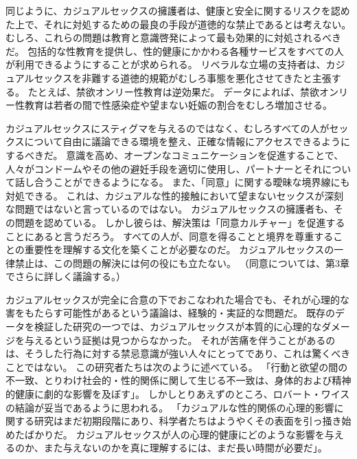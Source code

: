 \documentclass[paper=a4,book,openany]{jlreq}
\newcommand{\ig}[1]{}           %
\begin{document}
同じように、カジュアルセックスの擁護者は、健康と安全に関するリスクを認めた上で、それに対処するための最良の手段が道徳的な禁止であるとは考えない。
むしろ、これらの問題は教育と意識啓発によって最も効果的に対処されるべきだ。
包括的な性教育を提供し、性的健康にかかわる各種サービスをすべての人が利用できるようにすることが求められる。
リベラルな立場の支持者は、カジュアルセックスを非難する道徳的規範がむしろ事態を悪化させてきたと主張する。
たとえば、禁欲オンリー性教育は逆効果だ。
データによれば、禁欲オンリー性教育は若者の間で性感染症や望まない妊娠の割合をむしろ増加させる。

カジュアルセックスにスティグマを与えるのではなく、むしろすべての人がセックスについて自由に議論できる環境を整え、正確な情報にアクセスできるようにするべきだ。
意識を高め、オープンなコミュニケーションを促進することで、人々がコンドームやその他の避妊手段を適切に使用し、パートナーとそれについて話し合うことができるようになる。
また、「同意」に関する曖昧な境界線にも対処できる。
これは、カジュアルな性的接触において望まないセックスが深刻な問題ではないと言っているのではない。
カジュアルセックスの擁護者も、その問題を認めている。
しかし彼らは、解決策は「同意カルチャー」を促進することにあると言うだろう。
すべての人が、同意を得ることと境界を尊重することの重要性を理解する文化を築くことが必要なのだ。
カジュアルセックスの一律禁止は、この問題の解決には何の役にも立たない。
（同意については、第3章でさらに詳しく議論する。）

カジュアルセックスが完全に合意の下でおこなわれた場合でも、それが心理的な害をもたらす可能性があるという議論は、経験的・実証的な問題だ。
既存のデータを検証した研究の一つでは、カジュアルセックスが本質的に心理的なダメージを与えるという証拠は見つからなかった。
それが苦痛を伴うことがあるのは、そうした行為に対する禁忌意識が強い人々にとってであり、これは驚くべきことではない。
この研究者たちは次のように述べている。
「行動と欲望の間の不一致、とりわけ社会的・性的関係に関して生じる不一致は、身体的および精神的健康に劇的な影響を及ぼす」\citep{garcia12:_sexual_hookup_cultur}。
しかしとりあえずのところ、ロバート・ワイス\ig{Robert Weiss}の結論が妥当であるように思われる。
「カジュアルな性的関係の心理的影響に関する研究はまだ初期段階にあり、科学者たちはようやくその表面を引っ掻き始めたばかりだ。
カジュアルセックスが人の心理的健康にどのような影響を与えるのか、また与えないのかを真に理解するには、まだ長い時間が必要だ」\citep{weiss15:_what_are_psyc}。
\end{document}
